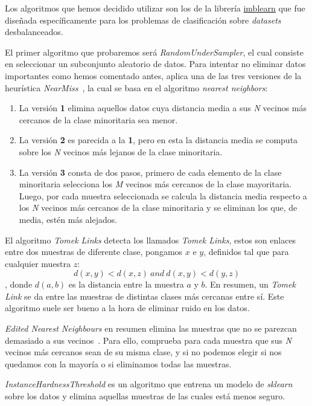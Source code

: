 Los algoritmos que hemos decidido utilizar son los de la librería \href{https://imbalanced-learn.org/stable/}{imblearn} que fue diseñada específicamente para los problemas de clasificación sobre \textit{datasets} desbalanceados.\ \cite{3Undersa98:online}

El primer algoritmo que probaremos será \textit{RandomUnderSampler}, el cual consiste en seleccionar un subconjunto aleatorio de datos. Para intentar no eliminar datos importantes como hemos comentado antes, aplica una de las
tres versiones de la heurística \textit{NearMiss}\ \cite{3Undersa98:online}, la cual se basa en el algoritmo \textit{nearest neighbors}:

\begin{enumerate}
    \item La versión \textbf{1} elimina aquellos datos cuya distancia media a sus \textit{N} vecinos más cercanos de la clase minoritaria sea menor.
    \item La versión \textbf{2} es parecida a la \textbf{1}, pero en esta la distancia media se computa sobre los \textit{N} vecinos más lejanos de la clase minoritaria.
    \item La versión \textbf{3} consta de dos pasos, primero de cada elemento de la clase minoritaria selecciona los \textit{M} vecinos más cercanos de la clase mayoritaria. Luego, por cada muestra seleccionada se calcula la
        distancia media respecto a los \textit{N} vecinos más cercanos de la clase minoritaria y se eliminan los que, de media, estén más alejados.
\end{enumerate}

El algoritmo \textit{Tomek Links} detecta los llamados \textit{Tomek Links}, estos son enlaces entre dos muestras de diferente clase, pongamos \(x\) e \(y\), definidos tal que para cualquier muestra \(z\): 
\[d(x,y) < d(x,z)\ and\ d(x,y) < d(y,z)\], donde \(d(a, b)\) es la distancia entre la muestra \(a\) y \(b\). En resumen, un \textit{Tomek Link} se da entre las muestras de distintas clases más 
cercanas entre sí. Este algoritmo suele ser bueno a la hora de eliminar ruido en los datos.

\textit{Edited Nearest Neighbours} en resumen elimina las muestras que no se parezcan demasiado a sus vecinos\ \cite{Wil72}. Para ello, comprueba para cada muestra que sus \textit{N} vecinos más cercanos sean de su misma clase,
y si no podemos elegir si nos quedamos con la mayoría o si eliminamos todas las muestras.

\textit{InstanceHardnessThreshold} es un algoritmo que entrena un modelo de \textit{sklearn} sobre los datos y elimina aquellas muestras de las cuales está menos seguro.


